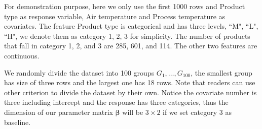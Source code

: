 \documentclass[12pt]{article}
\begin{document}
For demonstration purpose, here we only use the first 1000 rows and Product type as response variable, Air temperature and Process temperature as covariates. The feature Product type is categorical and has three levels, ``M", ``L", ``H", we denote them as category 1, 2, 3 for simplicity. The number of products that fall in category 1, 2, and 3 are 285, 601, and 114. The other two features are continuous.


We randomly divide the dataset into 100 groups $G_1,\dots,G_{100}$, the smallest group has size of three rows and the largest one has 18 rows. Note that readers can use other criterion to divide the dataset by their own. Notice the covariate number is three including intercept and the response has three categories, thus the dimension of our parameter matrix $\boldsymbol{\beta}$ will be $3 \times 2$ if we set category 3 as baseline.
\end{document}

